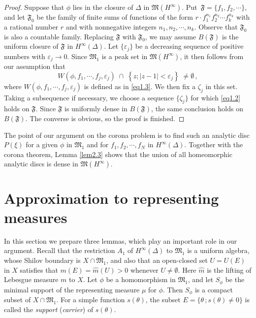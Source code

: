 \documentclass[12pt]{amsart}
\theoremstyle{plain}
\numberwithin{equation}{section}
\begin{document}
\begin{proof}
Suppose that $\phi$ lies in the closure of $\Delta$ in
$\mathfrak{M}(H^\infty)$. Put $\,\mathfrak{F}=\{f_1, f_2, \cdots \}$,
and let $\mathfrak{F}_0$ be the family of finite sums of functions
of the form $ r\cdot f_1^{n_1} f_2^{n_2} \cdots f_k^{n_k}$ with a
rational number $r$ and with nonnegative integers $n_1, n_2, \cdots, n_k$.
Observe that $\mathfrak{F}_0$ is also a countable family. Replacing
$\mathfrak{F}$ with $\mathfrak{F}_0$, we may assume $B(\mathfrak{F})$
is the uniform closure of $\mathfrak{F}$ in $H^\infty(\Delta)$.
Let $\{\varepsilon_j\}$ be a decreasing sequence of positive numbers
with $\varepsilon_j\to 0$. Since $\mathfrak{M}_1$ is a peak set in
$\mathfrak{M}(H^\infty)$, it then follows from our assumption that
$$
W(\phi, f_1, \cdots, f_j, \varepsilon_j)\;
\cap \;\left\{ z ; \vert z - 1 \vert < \varepsilon_j \right\}\; \neq \emptyset \,,
$$
where $W(\phi, f_1, \cdots, f_j, \varepsilon_j)$ is
defined as in \eqref{eq1.3}. We then fix a $\zeta_j$ in
this set. Taking a subsequence if necessary, we choose a
sequence $\{\zeta_j\}$ for which \eqref{eq1.2} holds on
$\mathfrak{F}$. Since $\mathfrak{F}$ is uniformly dense
in $B(\mathfrak{F})$, the same conclusion holds on
$B(\mathfrak{F})$. The converse is obvious,
so the proof is finished.
\end{proof}

\medskip
The point of our argument on the corona problem is to find such
an analytic disc $P(\xi)$ for a given $\phi$ in $\mathfrak{M}_1$
and for $f_1, f_2, \cdots, f_N$ in $H^\infty(\Delta)$.
Together with the corona theorem, Lemma \ref{lem2.3} shows
that the union of all homeomorphic analytic discs is dense in
$\mathfrak{M}(H^\infty)$.






\bigskip
\bigskip
\section{Approximation to representing measures}
\label{S3}

In this section we prepare three lemmas, which play an important role
in our argument. Recall that the restriction $A_1$ of
$H^\infty(\Delta)$ to $\mathfrak{M}_1$ is a uniform algebra,
whose Shilov boundary is $X\cap \mathfrak{M}_1$,
and also that an open-closed set $U=U(E)$ in $X$ satisfies that
$m(E)=\widehat{m}(U)> 0$ whenever $U\neq\emptyset$.
Here $\widehat{m}$ is the lifting of Lebesgue measure
$m$ to $X$.
Let $\phi$ be a homomorphism in $\mathfrak{M}_1$, and let
$S_\phi$ be the minimal support of the representing measure $\mu$
for $\phi$. Then $S_\phi$ is a compact subset of $X\cap \mathfrak{M}_1$.
For a simple function $s(\theta)$, the subset
$E=\{\theta\,; s(\theta)\neq 0 \}$ is called the
\textit{support} (\textit{carrier}) of $s(\theta)$.
\end{document}
